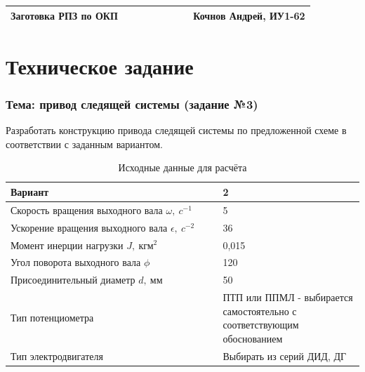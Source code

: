\documentclass[14pt,a4paper,russian]{scrartcl}
\begin{document}
\captionsetup[table]{name=Таблица}
\captionsetup[figure]{name=Рисунок}

\begin{table}[h]
    \begin{center}
        \begin{tabular}{p{0.6\linewidth}p{0.4\linewidth}}
            Заготовка РПЗ по ОКП&Кочнов Андрей, ИУ1-62\\
            \hline
        \end{tabular}
    \end{center}
\end{table}
\section*{Техническое задание}
\subsubsection*{Тема: привод следящей системы (задание №3)}
Разработать конструкцию привода следящей системы по предложенной схеме
в соответствии с заданным вариантом.
\begin{table}[h]
    \begin{center}
        \begin{tabular}{|p{0.6\linewidth}|p{0.4\linewidth}|}
            \hline
            Вариант &   2 \\
            \hline
            Скорость вращения выходного вала \( \omega,\ c^{-1} \) & 5 \\
            \hline
            Ускорение вращения выходного вала \( \epsilon,\ c^{-2} \) & 36 \\
            \hline
            Момент инерции нагрузки \( J,\ \text{кгм}^2 \) & 0,015\\
            \hline
            Угол поворота выходного вала \( \phi \) & 120\\
            \hline
            Присоединительный диаметр \( d,\ \text{мм} \) & 50 \\
            \hline
            Тип потенциометра & ПТП или ППМЛ - выбирается самостоятельно
                с соответствующим обоснованием \\
            \hline
            Тип электродвигателя & Выбирать из серий ДИД, ДГ \\
            \hline
        \end{tabular}
        \caption{Исходные данные для расчёта}\label{tab:source}
    \end{center}
\end{table}
\end{document}
